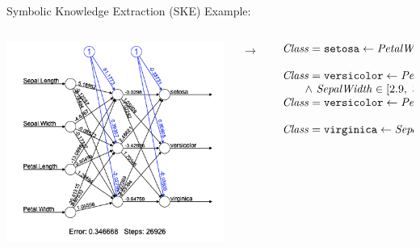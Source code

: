 \documentclass[presentation]{beamer}\mode<presentation>{\usetheme{AMSBolognaFC}}
\begin{document}
\begin{frame}[allowframebreaks]{Symbolic Knowledge Extraction (SKE)}
    Example:
    \begin{columns}
        \begin{column}{.43\linewidth}
            \includegraphics[width=\linewidth]{figures/nn-iris.png}
        \end{column}
        $\rightarrow$
        \begin{column}{.53\linewidth}\small
            \[ 
                \begin{array}{l}
                    \variable{Class} = \functor{setosa} \leftarrow \variable{PetalWidth} \leq 1.0 \fullstop
                    \\
                    \\
                    \variable{Class} = \functor{versicolor} \leftarrow \variable{PetalLength} > 4.9 \\ 
                        \qquad  \wedge\ \variable{SepalWidth} \in [2.9,\ 3.2] \fullstop
                    \\
                    \variable{Class} = \functor{versicolor} \leftarrow  \variable{PetalWidth} > 1.6 \fullstop
                    \\
                    \\
                    \variable{Class} = \functor{virginica} \leftarrow \variable{SepalWidth} \leq 2.9 \fullstop
                    \\
                    \\

\end{array}\]
\end{column}
\end{columns}
\end{frame}
\end{document}

